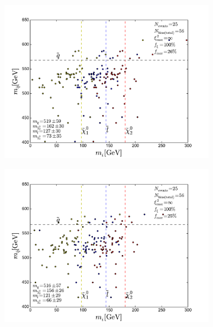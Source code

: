 \documentclass[twoside,english]{uiofysmaster}
\begin{document}
\begin{figure}[hbt]
	\centering
	\begin{subfigure}[b]{0.45\textwidth}
		\includegraphics[width=\textwidth]{figures/improving_combinatorics/herwigpp-MD-dileptonedge-fit-comb-nosmear-nocut_TMP.pdf} 
		\caption{ }
	\end{subfigure}
	\begin{subfigure}[b]{0.45\textwidth}
		\includegraphics[width=\textwidth]{figures/improving_combinatorics/herwigpp-MD-dileptonedge-fit-comb-nosmear-nocut_400-300-200-100.pdf}
		\caption{ } 
	\end{subfigure}


\end{figure}
\end{document}
